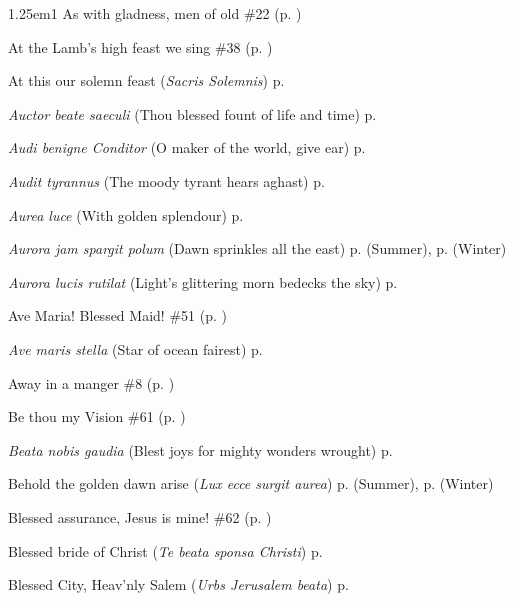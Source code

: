 \begin{hangparas}{1.25em}{1}
As with gladness, men of old \dotfill \#22 (p. \pageref{Hymn22})
\par\noindent
At the Lamb's high feast we sing \dotfill \#38 (p. \pageref{Hymn38})
\par\noindent
At this our solemn feast (\textit{Sacris Solemnis}) \dotfill p. \pageref{CorpusChristiInvitatory}
\par\noindent
\textit{Auctor beate saeculi} (Thou blessed fount of life and time) \dotfill p. \pageref{CompassionEvensongHymn}
\par\noindent
\textit{Audi benigne Conditor} (O maker of the world, give ear) \dotfill p. \pageref{FirstLentEvensong}
\par\noindent
\textit{Audit tyrannus} (The moody tyrant hears aghast) \dotfill p. \pageref{HolyInnocentsInvitatoryHymn}
\par\noindent
\textit{Aurea luce} (With golden splendour) \dotfill p. \pageref{PeterEvensong}
\par\noindent
\textit{Aurora jam spargit polum} (Dawn sprinkles all the east) \dotfill p. \pageref{SaturdayMattinsSummer} (Summer), p. \pageref{SaturdayMattinsWinter} (Winter)
\par\noindent
\textit{Aurora lucis rutilat} (Light's glittering morn bedecks the sky) \dotfill p. \pageref{EasterDayMattins}
\par\noindent
Ave Maria! Blessed Maid! \dotfill \#51 (p. \pageref{Hymn51})
\par\noindent
\textit{Ave maris stella} (Star of ocean fairest) \dotfill p. \pageref{BVMEvensong}
\par\noindent
Away in a manger \dotfill \#8 (p. \pageref{Hymn8})
\par\noindent
Be thou my Vision \dotfill \#61 (p. \pageref{Hymn61})
\par\noindent
\textit{Beata nobis gaudia} (Blest joys for mighty wonders wrought) \dotfill p. \pageref{WhitsundayMattinsHymn}
\par\noindent
Behold the golden dawn arise (\textit{Lux ecce surgit aurea}) \dotfill p. \pageref{ThursdayMattinsSummer} (Summer), p. \pageref{ThursdayMattinsWinter} (Winter)
\par\noindent
Blessed assurance, Jesus is mine! \dotfill \#62 (p. \pageref{Hymn62})
\par\noindent
Blessed bride of Christ (\textit{Te beata sponsa Christi}) \dotfill p. \pageref{ScholasticaEvensong}
\par\noindent
Blessed City, Heav'nly Salem (\textit{Urbs Jerusalem beata}) \dotfill p. \pageref{DedicationEvensong}

\end{hangparas}
